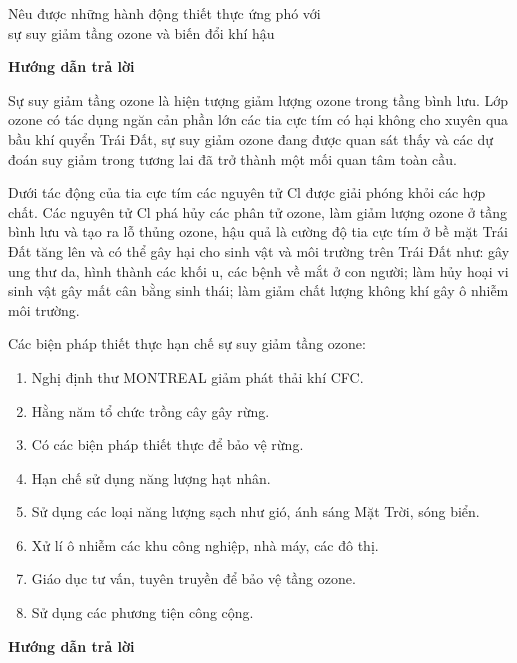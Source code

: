 \begin{dang}{Nêu được những hành động thiết thực ứng phó với\\ sự suy giảm tầng ozone và biến đổi khí hậu}
	{	\begin{center}
			\textbf{Hướng dẫn trả lời}
		\end{center}
		
		Sự suy giảm tầng ozone là hiện tượng giảm lượng ozone trong tầng bình lưu. Lớp ozone có tác dụng ngăn cản phần lớn các tia cực tím có hại không cho xuyên qua bầu khí quyển Trái Đất, sự suy giảm ozone đang được quan sát thấy và các dự đoán suy giảm trong tương lai đã trở thành một mối quan tâm toàn cầu.
		
		Dưới tác động của tia cực tím các nguyên tử Cl được giải phóng khỏi các hợp chất. Các nguyên tử Cl phá hủy các phân tử ozone, làm giảm lượng ozone ở tầng bình lưu và tạo ra lỗ thủng ozone, hậu quả là cường độ tia cực tím ở bề mặt Trái Đất tăng lên và có thể gây hại cho sinh vật và môi trường trên Trái Đất như: gây ung thư da, hình thành các khối u, các bệnh về mắt ở con người; làm hủy hoại vi sinh vật gây mất cân bằng sinh thái; làm giảm chất lượng không khí gây ô nhiễm môi trường.
		
		Các biện pháp thiết thực hạn chế sự suy giảm tầng ozone:
		\begin{enumerate}
			\item Nghị định thư MONTREAL giảm phát thải khí CFC.
			\item Hằng năm tổ chức trồng cây gây rừng.
			\item Có các biện pháp thiết thực để bảo vệ rừng.
			\item Hạn chế sử dụng năng lượng hạt nhân.
			\item Sử dụng các loại năng lượng sạch như gió, ánh sáng Mặt Trời, sóng biển.
			\item Xử lí ô nhiễm các khu công nghiệp, nhà máy, các đô thị.
			\item Giáo dục tư vấn, tuyên truyền để bảo vệ tầng ozone.
			\item Sử dụng các phương tiện công cộng.
		\end{enumerate}
		
	}
	{	\begin{center}
			\textbf{Hướng dẫn trả lời}
		\end{center}
		
}
\end{dang}
